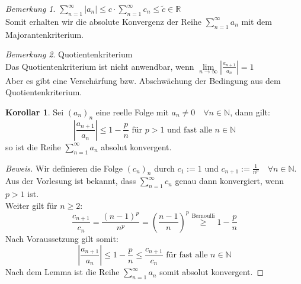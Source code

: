 \documentclass[12pt,a4paper,titlepage]{article} %
\theoremstyle{definition}
\newtheorem{kor}[satz]{Korollar}
\theoremstyle{remark}
\newtheorem*{bem}{Bemerkung}
\newenvironment{bew}{\begin{proof}[Beweis]}{\end{proof}}
\newcommand{\N}{\mathbb{N}}
\newcommand{\R}{\mathbb{R}}
\newcommand{\limes}[1]{\lim\limits_{#1\rightarrow\infty}}
\begin{document}
	\begin{bem}
		\(\sum_{n=1}^{\infty} |a_n| \leq c \cdot \sum_{n=1}^{\infty} c_n \leq \tilde{c} \in \R\)\\
		Somit erhalten wir die absolute Konvergenz der Reihe \(\sum_{n=1}^{\infty} a_n\) mit dem Majorantenkriterium.
	\end{bem}
	\begin{bem}
		Quotientenkriterium\\
		Das Quotientenkriterium ist nicht anwendbar, wenn \(\limes{n} \left|\frac{a_{n+1}}{a_n}\right| = 1\)\\
		Aber es gibt eine Verschärfung bzw. Abschwächung der Bedingung aus dem Quotientenkriterium.
	\end{bem}
	\begin{kor}
		Sei \((a_n)_n\) eine reelle Folge mit \(a_n \neq 0 \quad \forall n \in \N\), dann gilt:
		\[\left|\frac{a_{n+1}}{a_n}\right| \leq 1 - \frac{p}{n} \text{ für } p > 1 \text{ und fast alle } n \in \N\]
		so ist die Reihe \(\sum_{n=1}^{\infty} a_n\) absolut konvergent.
	\end{kor}
	\begin{bew}
		Wir definieren die Folge \((c_n)_n\) durch \(c_1 := 1\) und \(c_{n+1} := \frac{1}{n^p} \quad \forall n \in \N\).\\
		Aus der Vorlesung ist bekannt, dass \(\sum_{n=1}^{\infty} c_n\) genau dann konvergiert, wenn \(p > 1\) ist.\\
		Weiter gilt für \(n \geq 2\):
		\[\frac{c_{n+1}}{c_n} = \frac{(n-1)^p}{n^p} = \left(\frac{n-1}{n}\right)^p \overset{\text{Bernoulli}}{\geq} 1 - \frac{p}{n}\]
		Nach Voraussetzung gilt somit:
		\[\left|\frac{a_{n+1}}{a_n}\right| \leq 1 - \frac{p}{n} \leq \frac{c_{n+1}}{c_n} \text{ für fast alle } n \in \N\]
		Nach dem Lemma ist die Reihe \(\sum_{n=1}^{\infty} a_n\) somit absolut konvergent.
	\end{bew}
\end{document}
